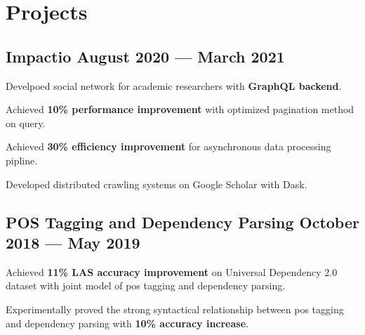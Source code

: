 \section{Projects}



\subsection*{Impactio \hfill August 2020 --- March 2021} 
    \begin{zitemize}
        \item Develpoed social network for academic researchers with \textbf{GraphQL backend}.
        \item Achieved \textbf{10\% performance improvement} with optimized pagination method on query.
        \item Achieved \textbf{30\% efficiency improvement} for asynchronous data processing pipline.
        \item Developed distributed crawling systems on Google Scholar with Dask.
    \end{zitemize}


\subsection*{POS Tagging and Dependency Parsing \hfill October 2018 --- May 2019} 
    \begin{zitemize}
        \item Achieved \textbf{11\% LAS accuracy improvement} on Universal Dependency 2.0 dataset with joint model of pos tagging and dependency parsing.
        \item Experimentally proved the strong syntactical relationship between pos tagging and dependency parsing with \textbf{10\% accuracy increase}.
    \end{zitemize}


